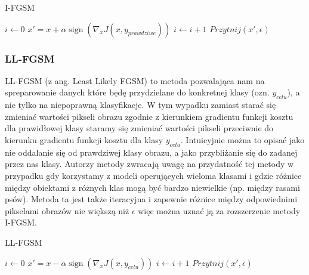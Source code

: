 \documentclass[
    left=2.5cm,         %
    right=2.5cm,        %
    top=2.5cm,          %
    bottom=3cm,         %
    bindingoffset=6mm,  %
    nohyphenation=false %
]{eiti/eiti-thesis}
\begin{document}
    \begin{algorithm}
    \caption{I-FGSM}\label{IFGSM}
    \begin{algorithmic}[1]
    \State $i \gets 0$
        \State $x' = x + \alpha\operatorname{sign}(\nabla_{x} J(x, y_{prawdziwe}))$
        \State $i \gets i+1$
        \State $Przytnij(x', \epsilon)$
    \EndWhile
    \end{algorithmic}
    \end{algorithm}

    \subsubsection{LL-FGSM}
    LL-FGSM (z ang. Least Likely FGSM) to metoda pozwalająca nam na spreparowanie danych które będę przydzielane do
    konkretnej klasy (ozn. $y_{celu}$), a nie tylko na niepoprawną klasyfikacje. W tym wypadku zamiast starać się
    zmieniać wartości pikseli obrazu zgodnie z kierunkiem gradientu funkcji kosztu dla prawidłowej klasy
    staramy się zmieniać wartości pikseli przeciwnie do kierunku gradientu funkcji kosztu dla klasy $y_{celu}$.
    Intuicyjnie można to opisać jako nie oddalanie się od prawdziwej klasy obrazu, a jako przybliżanie się do zadanej
    przez nas klasy.
    Autorzy metody zwracają uwagę na przydatność tej metody
    w przypadku gdy korzystamy z modeli operujących wieloma klasami i gdzie różnice między obiektami z różnych klas mogą
    być bardzo niewielkie (np. między rasami psów). Metoda ta jest także iteracyjna i zapewnie różnice między
    odpowiednimi pikselami obrazów nie większą niż $\epsilon$ więc można uznać ją za rozszerzenie metody I-FGSM.

    \begin{algorithm}
    \caption{LL-FGSM}\label{LLFGSM}
    \begin{algorithmic}[1]
    \State $i \gets 0$
        \State $x' = x - \alpha\operatorname{sign}(\nabla_{x} J(x, y_{celu}))$
        \State $i \gets i+1$
        \State $Przytnij(x', \epsilon)$
    \EndWhile
    \end{algorithmic}
    \end{algorithm}
\end{document}
